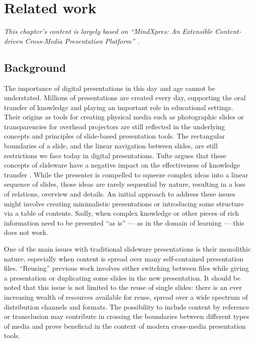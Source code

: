 
 \chapter{Related work}

  \emph{This chapter's content is largely based on ``MindXpres: An Extensible
  Content-driven Cross-Media Presentation Platform'' \citep{roels-1}.}

  \section{Background}

   The importance of digital presentations in this day and age cannot be
   understated. Millions of presentations are created every day, supporting the
   oral transfer of knowledge and playing an important role in educational
   settings. Their origins as tools for creating physical media such as
   photographic slides or transparencies for overhead projectors are still
   reflected in the underlying concepts and principles of slide-based
   presentation tools. The rectangular boundaries of a slide, and the linear
   navigation between slides, are still restrictions we face today in digital
   presentations. Tufte argues that these concepts of slideware have a negative
   impact on the effectiveness of knowledge transfer \citep{tufte-1}.  While
   the presenter is compelled to squeeze complex ideas into a linear sequence
   of slides, those ideas are rarely sequential by nature, resulting in a loss
   of relations, overview and details. An initial approach to address these
   issues might involve creating minimalistic presentations or introducing some
   structure via a table of contents. Sadly, when complex knowledge or other
   pieces of rich information need to be presented “as is” \citep{farkas-1} ---
   as in the domain of learning --- this does not work.

   One of the main issues with traditional slideware presentations is their
   monolithic nature, especially when content is spread over many
   self-contained presentation files. ``Reusing'' previous work involves either
   switching between files while giving a presentation or duplicating some
   slides in the new presentation. It should be noted that this issue is not
   limited to the reuse of single slides: there is an ever increasing wealth of
   resources available for reuse, spread over a wide spectrum of distribution
   channels and formats. The possibility to include content by reference or
   transclusion \citep{nelson-1} may contribute in crossing the boundaries
   between different types of media and prove beneficial in the context of
   modern cross-media presentation tools.

